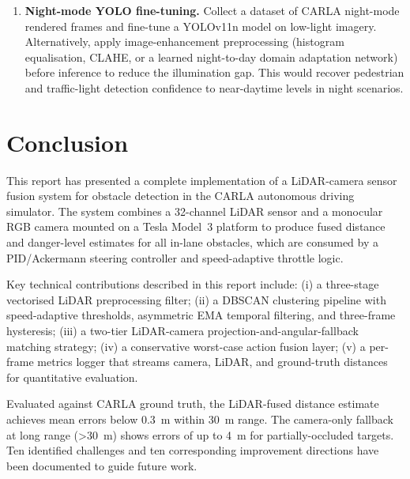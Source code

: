 \documentclass[12pt,a4paper]{article}
\begin{document}
\begin{enumerate}[label=\textbf{\arabic{enumi}.}, leftmargin=2.5em,
                  itemsep=6pt]
  \item \textbf{Night-mode YOLO fine-tuning.}
    Collect a dataset of CARLA night-mode rendered frames and fine-tune
    a YOLOv11n model on low-light imagery.  Alternatively, apply
    image-enhancement preprocessing (histogram equalisation, CLAHE, or a
    learned night-to-day domain adaptation network) before inference to
    reduce the illumination gap.  This would recover pedestrian and
    traffic-light detection confidence to near-daytime levels in night
    scenarios.

\end{enumerate}

\section*{Conclusion}
\label{sec:conclusion}

This report has presented a complete implementation of a LiDAR-camera
sensor fusion system for obstacle detection in the CARLA autonomous driving
simulator.  The system combines a 32-channel LiDAR sensor and a monocular
RGB camera mounted on a Tesla Model~3 platform to produce fused distance
and danger-level estimates for all in-lane obstacles, which are consumed
by a PID/Ackermann steering controller and speed-adaptive throttle logic.

Key technical contributions described in this report include:
(i) a three-stage vectorised LiDAR preprocessing filter;
(ii) a DBSCAN clustering pipeline with speed-adaptive thresholds, asymmetric
EMA temporal filtering, and three-frame hysteresis;
(iii) a two-tier LiDAR-camera projection-and-angular-fallback matching
strategy;
(iv) a conservative worst-case action fusion layer;
(v) a per-frame metrics logger that streams camera, LiDAR, and ground-truth
distances for quantitative evaluation.

Evaluated against CARLA ground truth, the LiDAR-fused distance estimate
achieves mean errors below \SI{0.3}{\metre} within \SI{30}{\metre} range.
The camera-only fallback at long range (\textgreater\SI{30}{\metre}) shows
errors of up to \SI{4}{\metre} for partially-occluded targets.  Ten
identified challenges and ten corresponding improvement directions have been
documented to guide future work.
\end{document}
